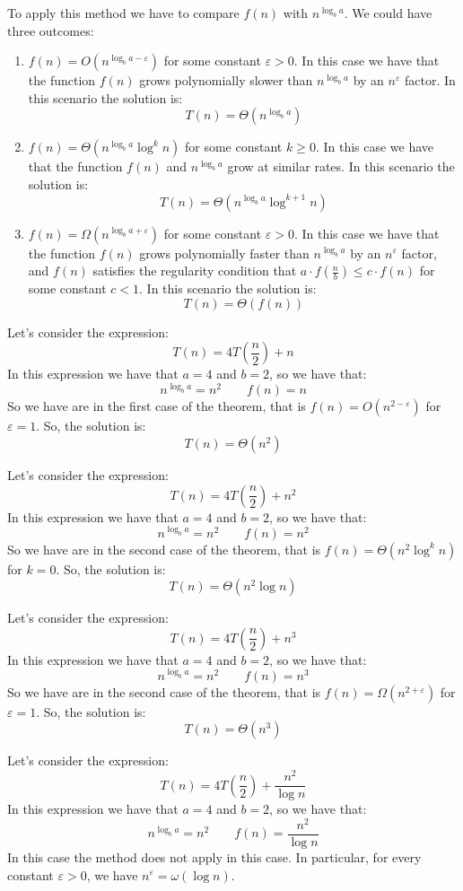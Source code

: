 To apply this method we have to compare $f(n)$ with $n^{\log_ba}$. 
We could have three outcomes: 
\begin{enumerate}
    \item $f(n)=O(n^{\log_ba-\varepsilon})$ for some constant $\varepsilon > 0$. 
        In this case we have that the function $f(n)$ grows polynomially slower than $n^{\log_ba}$ by an $n^\varepsilon$ factor. 
        In this scenario the solution is: 
        \[T(n)=\Theta(n^{\log_ba})\]
    \item $f(n)=\Theta(n^{\log_ba}\log^kn)$ for some constant $k \geq 0$. 
        In this case we have that the function $f(n)$ and $n^{\log_ba}$ grow at similar rates. 
        In this scenario the solution is: 
        \[T(n)=\Theta(n^{\log_ba}\log^{k+1}n)\]
    \item $f(n)=\Omega(n^{\log_ba+\varepsilon})$ for some constant $\varepsilon > 0$. 
        In this case we have that the function $f(n)$ grows polynomially faster than $n^{\log_ba}$ by an $n^\varepsilon$ factor, and $f(n)$ satisfies the regularity condition that $a \cdot f\left(\frac{n}{b}\right) \leq c \cdot f(n)$ for some constant $c < 1$.
        In this scenario the solution is: 
        \[T(n)=\Theta(f(n))\]
\end{enumerate}
\begin{example}
    Let's consider the expression: 
    \[T(n)=4T\left(\frac{n}{2}\right)+n\]
    In this expression we have that $a=4$ and $b=2$, so we have that: 
    \[n^{\log_ba}=n^2 \qquad f(n)=n\]
    So we have are in the first case of the theorem, that is $f(n)=O(n^{2-\varepsilon})$ for $\varepsilon=1$. 
    So, the solution is: 
    \[T(n)=\Theta(n^2)\]

    Let's consider the expression: 
    \[T(n)=4T\left(\frac{n}{2}\right)+n^2\]
    In this expression we have that $a=4$ and $b=2$, so we have that: 
    \[n^{\log_ba}=n^2 \qquad f(n)=n^2\]
    So we have are in the second case of the theorem, that is $f(n)=\Theta(n^2\log^kn)$ for $k=0$. 
    So, the solution is: 
    \[T(n)=\Theta(n^2\log n)\]

    Let's consider the expression: 
    \[T(n)=4T\left(\frac{n}{2}\right)+n^3\]
    In this expression we have that $a=4$ and $b=2$, so we have that: 
    \[n^{\log_ba}=n^2 \qquad f(n)=n^3\]
    So we have are in the second case of the theorem, that is $f(n)=\Omega(n^{2+\varepsilon})$ for $\varepsilon=1$. 
    So, the solution is: 
    \[T(n)=\Theta(n^3)\]

    Let's consider the expression: 
    \[T(n)=4T\left(\frac{n}{2}\right)+\frac{n^2}{\log n}\]
    In this expression we have that $a=4$ and $b=2$, so we have that: 
    \[n^{\log_ba}=n^2 \qquad f(n)=\frac{n^2}{\log n}\]
    In this case the method does not apply in this case. 
    In particular, for every constant $\varepsilon > 0$, we have $n^\varepsilon = \omega(\log n)$.
\end{example}